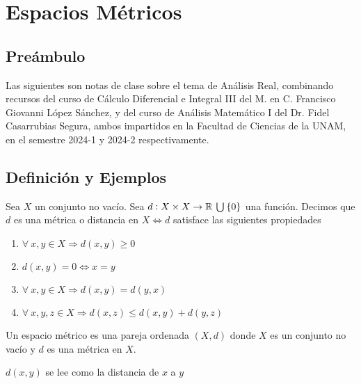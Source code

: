\chapter{Espacios Métricos}

\section{Preámbulo}

Las siguientes son notas de clase sobre el tema de Análisis Real, combinando recursos del curso de Cálculo Diferencial e Integral III del M. en C. Francisco Giovanni López Sánchez, y del curso de Análisis Matemático I del Dr. Fidel Casarrubias Segura, ambos impartidos en la Facultad de Ciencias de la UNAM, en el semestre 2024-1 y 2024-2 respectivamente. 

\section{Definición y Ejemplos}

\begin{definition} \label{def1}
    Sea $X$ un conjunto no vacío. Sea $d: X \times X \to \mathbb{R} \: \bigcup \: \{ 0 \}$ una función. Decimos que $d$ es una métrica o distancia en $X \Leftrightarrow d$ satisface las siguientes propiedades
    \begin{enumerate}[label=(\subscript{D}{{\arabic*}})]
        \item $\forall \: x,y \in X \Rightarrow d(x,y) \geqslant 0$ 
        \item $d(x,y) = 0 \Leftrightarrow x=y$
        \item $\forall \: x,y \in X \Rightarrow d(x,y) = d(y,x)$
        \item $\forall \: x,y,z \in X \Rightarrow d(x,z) \leqslant d(x,y) + d(y,z)$
    \end{enumerate}
   Un espacio métrico es una pareja ordenada $(X,d)$ donde $X$ es un conjunto no vacío y $d$ es una métrica en $X$.
\end{definition}

\begin{remark}
    $d(x,y)$ se lee como la distancia de $x$ a $y$
\end{remark}

